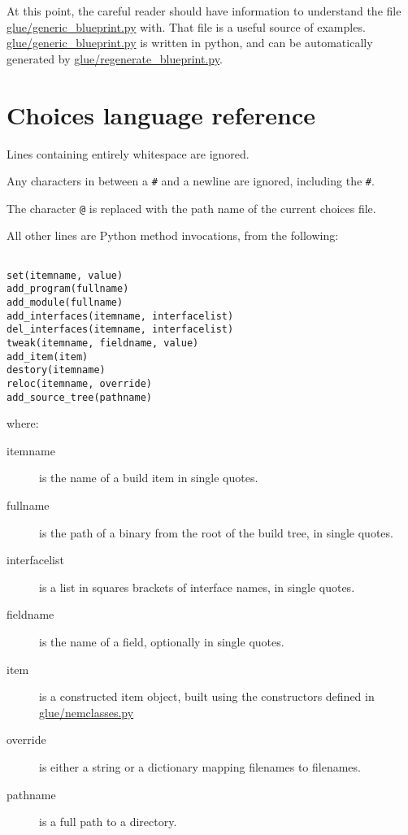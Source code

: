 \documentclass[a4paper]{article}
\begin{document}
At this point, the careful reader should have information to understand
the file \url{glue/generic_blueprint.py} with. That file is a useful
source of examples. \url{glue/generic_blueprint.py} is written in
python, and can be automatically generated by
\url{glue/regenerate_blueprint.py}.


\section{Choices language reference}

Lines containing entirely whitespace are ignored.

Any characters in between a \verb'#' and a newline are ignored, including
the \verb'#'.

The character \verb'@' is replaced with the path name of the current
choices file.

All other lines are Python method invocations, from the following:

\begin{verbatim}

set(itemname, value)
add_program(fullname)
add_module(fullname)
add_interfaces(itemname, interfacelist)
del_interfaces(itemname, interfacelist)
tweak(itemname, fieldname, value)
add_item(item)
destory(itemname)
reloc(itemname, override)
add_source_tree(pathname)
\end{verbatim}

where:

\begin{description}
\item[itemname] is the name of a build item in single quotes.

\item[fullname] is the path of a binary from the root of the build
tree, in single quotes.

\item[interfacelist] is a list in squares brackets of interface names,
in single quotes.

\item[fieldname] is the name of a field, optionally in single quotes.

\item[item] is a constructed item object, built using the constructors
defined in \url{glue/nemclasses.py}

\item[override] is either a string or a dictionary mapping filenames
to filenames.

\item[pathname] is a full path to a directory.
\end{description}
\end{document}
